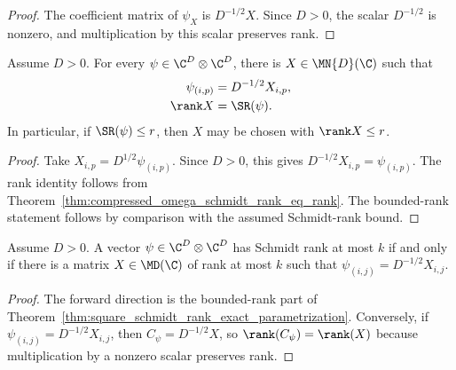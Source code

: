 \begin{proof}
    \leanok
    The coefficient matrix of $\psi_X$ is $D^{-1/2}X$. Since $D>0$, the
    scalar $D^{-1/2}$ is nonzero, and multiplication by this scalar preserves
    rank.
\end{proof}

\begin{theorem}
    \label{thm:square_schmidt_rank_exact_parametrization}
    \leanok
    Assume $D>0$. For every $\psi\in\C^D\otimes\C^D$, there is
    $X\in\MN{D}(\C)$ such that
    \begin{align}
        \psi_{(i,p)}
         & =D^{-1/2}X_{i,p}, \notag \\
        \rank X
         & =\SR(\psi).
        \label{eq:schwarz_square_schmidt_representative}
    \end{align}
    In particular, if $\SR(\psi)\le r$, then $X$ may be chosen with
    $\rank X\le r$.
\end{theorem}

\begin{proof}
    \leanok
    Take $X_{i,p}=D^{1/2}\psi_{(i,p)}$. Since $D>0$, this gives
    $D^{-1/2}X_{i,p}=\psi_{(i,p)}$. The rank identity follows from
    Theorem~\ref{thm:compressed_omega_schmidt_rank_eq_rank}. The bounded-rank
    statement follows by comparison with the assumed Schmidt-rank bound.
\end{proof}

\begin{lemma}
    \label{lem:schmidt_rank_square_compressed_omega}
    \leanok
    Assume $D>0$. A vector $\psi\in\C^D\otimes\C^D$ has Schmidt rank at most
    $k$ if and only if there is a matrix $X\in\MD(\C)$ of rank at most $k$
    such that $\psi_{(i,j)}=D^{-1/2}X_{i,j}$.
\end{lemma}

\begin{proof}
    \leanok
    The forward direction is the bounded-rank part of
    Theorem~\ref{thm:square_schmidt_rank_exact_parametrization}. Conversely,
    if $\psi_{(i,j)}=D^{-1/2}X_{i,j}$, then
    $C_\psi=D^{-1/2}X$, so $\rank(C_\psi)=\rank(X)$ because multiplication
    by a nonzero scalar preserves rank.
\end{proof}

